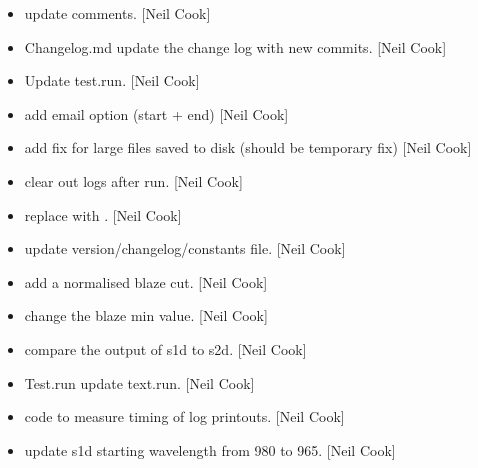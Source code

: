 \documentclass[a4paper,10pt,english]{report}
\begin{document}
\begin{itemize}
\item {} 
 \sphinxhyphen{} update comments. {[}Neil Cook{]}

\item {} 
Changelog.md \sphinxhyphen{} update the change log with new commits. {[}Neil Cook{]}

\item {} 
Update test.run. {[}Neil Cook{]}

\item {} 
 \sphinxhyphen{} add email option (start + end) {[}Neil Cook{]}

\item {} 
 \sphinxhyphen{} add fix for large files saved to disk (should be
temporary fix) {[}Neil Cook{]}

\item {} 
 \sphinxhyphen{} clear out logs after run. {[}Neil Cook{]}

\item {} 
 \sphinxhyphen{} replace  with .
{[}Neil Cook{]}

\item {} 
 \sphinxhyphen{} update version/changelog/constants file. {[}Neil Cook{]}

\item {} 
 \sphinxhyphen{} add a normalised blaze cut. {[}Neil Cook{]}

\item {} 
 \sphinxhyphen{} change the blaze min value. {[}Neil Cook{]}

\item {} 
 \sphinxhyphen{} compare the output of s1d to s2d. {[}Neil Cook{]}

\item {} 
Test.run \sphinxhyphen{} update text.run. {[}Neil Cook{]}

\item {} 
 \sphinxhyphen{} code to measure timing of log printouts. {[}Neil
Cook{]}

\item {} 
 \sphinxhyphen{} update s1d starting wavelength from 980 to
965. {[}Neil Cook{]}


\end{itemize}
\end{document}
